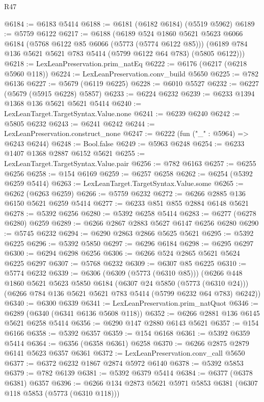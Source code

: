 \begin{lexlean}{R47}
\begin{coremodule}
@6184 := @6183 @5414
@6188 := @6181 (@6182 @6184) (@5519 @5962)
@6189 := @5759 @6122
@6217 := @6188
    (@6189
      @524
      @1860
      @5621
      @5623
      @6066
      @6184
      (@5768 @6122 @85 @6066 (@5773 (@5774 @6122 @85)))
      (@6189 @784 @136 @5621 @5621 @783 @5414 (@5799 @6122 @64 @783) (@5805 @6122)))
@6218 := LexLeanPreservation.prim_natEq
@6222 := @6176 (@6217 (@6218 @5960 @118))
@6224 := LexLeanPreservation.conv_build @5650
@6225 := @782 @6136
@6227 := @5679 (@6119 @6225)
@6228 := @6010 @5527
@6232 := @6227 (@5679 (@5915 @6228) @5857)
@6233 := @6224 @6232
@6239 := @6233 @1394 @1368 @136 @5621 @5621 @5414
@6240 := LexLeanTarget.TargetSyntax.Value.none
@6241 := @6239 @6240
@6242 := @5805 @6232
@6243 := @6241 @6242
@6244 := LexLeanPreservation.construct_none
@6247 := @6222 (fun ("_" : @5964) => @6243 @6244)
@6248 := Bool.false
@6249 := @5963 @6248
@6254 := @6233 @1407 @1368 @2887 @6152 @5621
@6255 := LexLeanTarget.TargetSyntax.Value.pair
@6256 := @782 @6163
@6257 := @6255 @6256
@6258 := @154 @6169
@6259 := @6257 @6258
@6262 := @6254 (@5392 @6259 @5414)
@6263 := LexLeanTarget.TargetSyntax.Value.some
@6265 := @6262 (@6263 @6259)
@6266 := @5759 @6232
@6272 := @6266 @2885 @136 @6150 @5621 @6259 @5414
@6277 := @6233 @851 @855 @2884 @6148 @5621
@6278 := @5392 @6256
@6280 := @5392 @6258 @5414
@6283 := @6277 (@6278 @6280) @6259
@6289 := @6266 @2867 @2883 @5627 @6147 @6256 @6280
@6290 := @5745 @6232
@6294 := @6290 @2863 @2866 @5625 @5621
@6295 := @5392 @6225
@6296 := @5392 @5850
@6297 := @6296 @6184
@6298 := @6295 @6297
@6300 := @6294 @6298 @6256
@6306 := @6266 @524 @2865 @5621 @5624 @6225 @6297
@6307 := @5768 @6232
@6309 := @6307 @85 @6225
@6310 := @5774 @6232
@6339 := @6306
    (@6309 (@5773 (@6310 @85)))
    (@6266
      @448
      @1860
      @5621
      @5623
      @5850
      @6184
      (@6307 @24 @5850 (@5773 (@6310 @24)))
      (@6266 @784 @136 @5621 @5621 @783 @5414 (@5799 @6232 @64 @783) @6242))
@6340 := @6300 @6339
@6341 := LexLeanPreservation.prim_natQuot
@6346 := @6289 (@6340 (@6341 @6136 @5608 @118))
@6352 := @6266 @2881 @136 @6145 @5621 @6258 @5414
@6356 := @6290 @147 @2880 @6143 @5621
@6357 := @154 @6166
@6358 := @5392 @6357
@6359 := @154 @6168
@6361 := @5392 @6359 @5414
@6364 := @6356 (@6358 @6361) @6258
@6370 := @6266 @2875 @2879 @6141 @5623 @6357 @6361
@6372 := LexLeanPreservation.conv_call @5650
@6377 := @6372 @6232 @1867 @2874 @5972 @6140
@6378 := @5392 @5853
@6379 := @782 @6139
@6381 := @5392 @6379 @5414
@6384 := @6377 (@6378 @6381) @6357
@6396 := @6266 @134 @2873 @5621 @5971 @5853 @6381 (@6307 @118 @5853 (@5773 (@6310 @118)))

\end{coremodule}
\end{lexlean}
